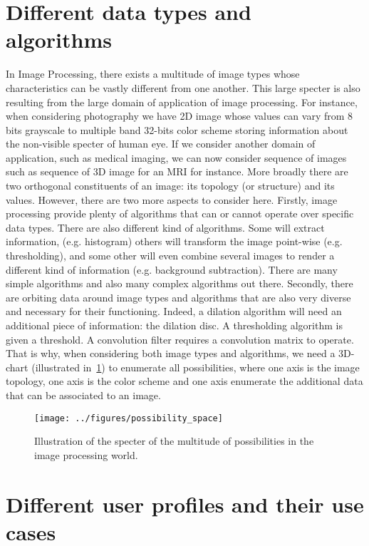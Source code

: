 \section*{Different data types and algorithms}

In Image Processing, there exists a multitude of image types whose characteristics can be vastly different from one
another. This large specter is also resulting from the large domain of application of image processing. For instance,
when considering photography we have 2D image whose values can vary from 8 bits grayscale to multiple band 32-bits color
scheme storing information about the non-visible specter of human eye. If we consider another domain of application,
such as medical imaging, we can now consider sequence of images such as sequence of 3D image for an MRI for instance.
More broadly there are two orthogonal constituents of an image: its topology (or structure) and its values. However,
there are two more aspects to consider here. Firstly, image processing provide plenty of algorithms that can or cannot
operate over specific data types. There are also different kind of algorithms. Some will extract information, (e.g.
histogram) others will transform the image point-wise (e.g. thresholding), and some other will even combine several
images to render a different kind of information (e.g. background subtraction). There are many simple algorithms and
also many complex algorithms out there. Secondly, there are orbiting data around image types and algorithms that are
also very diverse and necessary for their functioning. Indeed, a dilation algorithm will need an additional piece of
information: the dilation disc. A thresholding algorithm is given a threshold. A convolution filter requires a
convolution matrix to operate. That is why, when considering both image types and algorithms, we need a 3D-chart
(illustrated in~\cref{fig:int.possibility_space}) to enumerate all possibilities, where one axis is the image topology,
one axis is the color scheme and one axis enumerate the additional data that can be associated to an image.


\begin{figure}[htbp]
  \centering
  \texttt{[image: ../figures/possibility\_space]}
  \caption{Illustration of the specter of the multitude of possibilities in the image processing world.}
  \label{fig:int.possibility_space}
\end{figure}


\section*{Different user profiles and their use cases}


